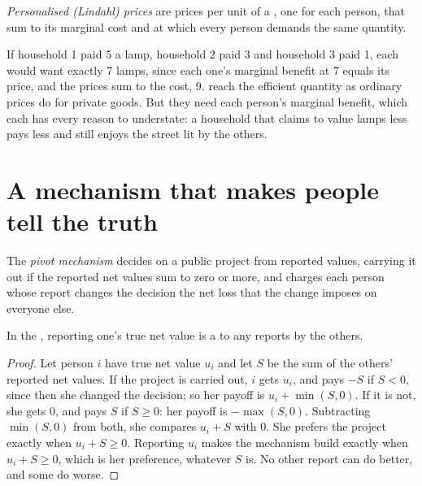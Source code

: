 \begin{definition}\label{def:b2:externalities-and-public-goods-theory:lindahl}
\emph{Personalised (Lindahl) prices} are prices per unit of a , one for each
person, that sum to its marginal cost and at which every person demands the same quantity.
\end{definition}

If household 1 paid 5 a lamp, household 2 paid 3 and household 3 paid 1, each would want exactly 7 lamps, since each one's marginal
benefit at 7 equals its price, and the prices sum to the cost, 9.  reach the efficient quantity as
ordinary prices do for private goods. But they need each person's marginal benefit, which each has every reason to
understate: a household that claims to value lamps less pays less and still enjoys the street lit by the others.

\section{A mechanism that makes people tell the truth}\label{sec:b2:externalities-and-public-goods-theory:pivot}

\begin{definition}\label{def:b2:externalities-and-public-goods-theory:pivot}
The \emph{pivot mechanism} decides on a public project from reported values, carrying it out if
the reported net values sum to zero or more, and charges each person whose report changes the decision the net loss
that the change imposes on everyone else.
\end{definition}

\begin{proposition}\label{prop:b2:externalities-and-public-goods-theory:pivot}
In the , reporting one's true net value is a  to any reports by the others.
\end{proposition}

\begin{proof}
Let person $i$ have true net value $u_i$ and let $S$ be the sum of the others' reported net values. If the project is carried out,
$i$ gets $u_i$, and pays $-S$ if $S < 0$, since then she changed the decision; so her payoff is $u_i + \min(S, 0)$. If it is not, she gets 0, and pays $S$ if
$S \ge 0$: her payoff is $-\max(S, 0)$. Subtracting $\min(S, 0)$ from both, she compares $u_i + S$ with 0. She prefers the project exactly when $u_i + S \ge 0$. Reporting
$u_i$ makes the mechanism build exactly when $u_i + S \ge 0$, which is her preference, whatever $S$ is. No other report can do better, and
some do worse.
\end{proof}

